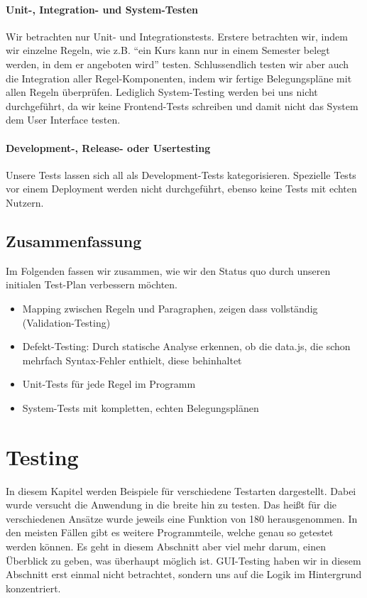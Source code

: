 \documentclass[ngerman]{article}
\begin{document}
\paragraph{Unit-, Integration- und System-Testen}
Wir betrachten nur Unit- und Integrationstests.
Erstere betrachten wir, indem wir einzelne Regeln, wie z.B. ``ein Kurs kann nur in einem Semester belegt werden, in dem er angeboten wird'' testen.
Schlussendlich testen wir aber auch die Integration aller Regel-Komponenten, indem wir fertige Belegungspläne mit allen Regeln überprüfen.
Lediglich System-Testing werden bei uns nicht durchgeführt, da wir keine Front\-end-Tests schreiben und damit nicht das System dem User Interface testen.

\paragraph{Development-, Release- oder Usertesting}
Unsere Tests lassen sich all als Development-Tests kategorisieren.
Spezielle Tests vor einem Deployment werden nicht durchgeführt, ebenso keine Tests mit echten Nutzern.

\subsection{Zusammenfassung}
\label{sec:zusammenfassung}

Im Folgenden fassen wir zusammen, wie wir den Status quo durch unseren initialen Test-Plan verbessern möchten.

\begin{itemize}
    \item Mapping zwischen Regeln und Paragraphen, zeigen dass vollständig (Va\-li\-da\-tion-Testing)
    \item
        Defekt-Testing: Durch statische Analyse erkennen, ob die data.js, die schon mehrfach Syntax-Fehler enthielt, diese behinhaltet
    \item
        Unit-Tests für jede Regel im Programm
    \item
        System-Tests mit kompletten, echten Belegungsplänen
\end{itemize}


\section{Testing}

In diesem Kapitel werden Beispiele für verschiedene Testarten dargestellt. Dabei wurde versucht die Anwendung in die breite hin zu testen. Das heißt für die verschiedenen Ansätze wurde jeweils eine Funktion von 180 herausgenommen. In den meisten Fällen gibt es weitere Programmteile, welche genau so getestet werden können. Es geht in diesem Abschnitt aber viel mehr darum, einen Überblick zu geben, was überhaupt möglich ist.
GUI-Testing haben wir in diesem Abschnitt erst einmal nicht betrachtet, sondern uns auf die Logik im Hintergrund konzentriert.
\end{document}
